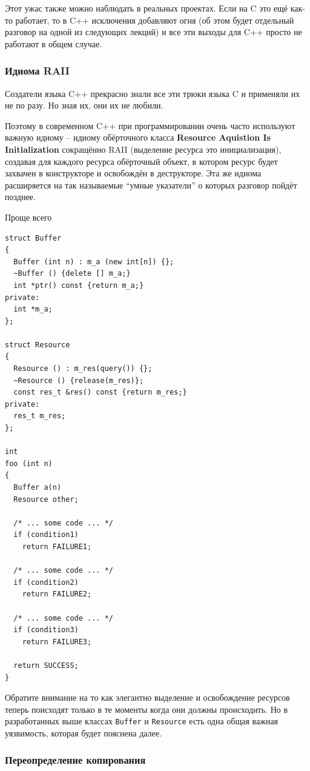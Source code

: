 \documentclass[a4paper,12pt,oneside]{article}
\begin{document}
Этот ужас также можно наблюдать в реальных проектах.
Если на C это ещё как-то работает, то в C++ исключения добавляют огня (об этом будет отдельный разговор на одной из следующих лекций) и все эти выходы для C++ просто не работают в общем случае.

\subsubsection{Идиома RAII}\label{RAII}

Создатели языка C++ прекрасно знали все эти трюки языка C и применяли их не по разу. Но зная их, они их не любили. 

Поэтому в современном C++ при программировании очень часто используют важную идиому – идиому обёрточного класса \textbf{Resource Aquistion Is Initialization} сокращённо RAII (выделение ресурса это инициализация), создавая для каждого ресурса обёрточный объект, в котором ресурс будет захвачен в конструкторе и освобождён в деструкторе. Эта же идиома расширяется на так называемые ``умные указатели'' о которых разговор пойдёт позднее.

Проще всего

\begin{lstlisting}
struct Buffer
{
  Buffer (int n) : m_a (new int[n]) {};
  ~Buffer () {delete [] m_a;}
  int *ptr() const {return m_a;}
private:
  int *m_a;
};

struct Resource
{
  Resource () : m_res(query()) {};
  ~Resource () {release(m_res)};
  const res_t &res() const {return m_res;}
private:
  res_t m_res;
};

int
foo (int n)
{
  Buffer a(n)
  Resource other;

  /* ... some code ... */
  if (condition1)
    return FAILURE1;

  /* ... some code ... */
  if (condition2)
    return FAILURE2;

  /* ... some code ... */
  if (condition3)
    return FAILURE3;

  return SUCCESS;
}

\end{lstlisting}

Обратите внимание на то как элегантно выделение и освобождение ресурсов теперь поисходят только в те моменты когда они должны происходить. Но в разработанных выше классах \lstinline!Buffer! и \lstinline!Resource! есть одна общая важная уязвимость, которая будет пояснена далее.

\subsubsection{Переопределение копирования}\label{CopyConstr}
\end{document}
